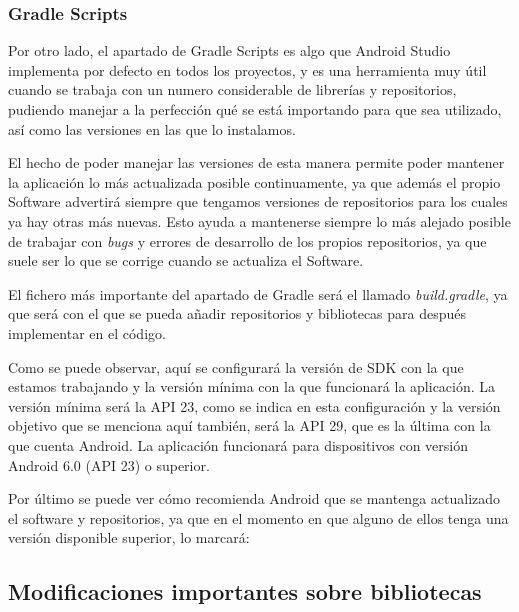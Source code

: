\subsubsection{Gradle Scripts}

Por otro lado, el apartado de Gradle Scripts \cite{gradle1} es algo que Android Studio implementa por defecto en todos los proyectos, y es una herramienta muy útil cuando se trabaja con un numero considerable de librerías y repositorios, pudiendo manejar a la perfección qué se está importando para que sea utilizado, así como las versiones en las que lo instalamos.

El hecho de poder manejar las versiones de esta manera permite poder mantener la aplicación lo más actualizada posible continuamente, ya que además el propio Software advertirá siempre que tengamos versiones de repositorios para los cuales ya hay otras más nuevas. Esto ayuda a mantenerse siempre lo más alejado posible de trabajar con \textit{bugs} y errores de desarrollo de los propios repositorios, ya que suele ser lo que se corrige cuando se actualiza el Software.

El fichero más importante del apartado de Gradle será el llamado \textit{build.gradle}, ya que será con el que se pueda añadir repositorios y bibliotecas para después implementar en el código.


Como se puede observar, aquí se configurará la versión de SDK con la que estamos trabajando y la versión mínima con la que funcionará la aplicación. La versión mínima será la API 23, como se indica en esta configuración y la versión objetivo que se menciona aquí también, será la API 29, que es la última con la que cuenta Android. La aplicación funcionará para dispositivos con versión Android 6.0 (API 23) o superior.

Por último se puede ver cómo recomienda Android que se mantenga actualizado el software y repositorios, ya que en el momento en que alguno de ellos tenga una versión disponible superior, lo marcará:


\subsection{Modificaciones importantes sobre bibliotecas}

